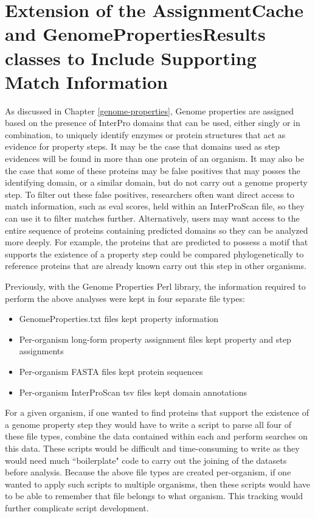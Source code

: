 \section{Extension of the AssignmentCache and GenomePropertiesResults classes to Include Supporting Match Information}

As discussed in Chapter \ref{genome-properties}, Genome properties are assigned based on the presence of InterPro domains that can be used, either singly or in combination, to uniquely identify enzymes or protein structures that act as evidence for property steps. It may be the case that domains used as step evidences will be found in more than one protein of an organism. It may also be the case that some of these proteins may be false positives that may posses the identifying domain, or a similar domain, but do not carry out a genome property step. To filter out these false positives, researchers often want direct access to match information, such as \gls{eval} scores, held within an InterProScan file, so they can use it to filter matches further. Alternatively, users may want access to the entire sequence of proteins containing predicted domains so they can be analyzed more deeply. For example, the proteins that are predicted to possess a motif that supports the existence of a property step could be compared phylogenetically to reference proteins that are already known carry out this step in other organisms. 

Previously, with the Genome Properties Perl library, the information required to perform the above analyses were kept in four separate file types:

\begin{itemize}
\item GenomeProperties.txt files kept property information
\item Per-organism long-form property assignment files kept property and step assignments
\item Per-organism FASTA files \cite{pearson19905} kept protein sequences 
\item  Per-organism InterProScan \gls{tsv} files kept domain annotations 
\end{itemize}

For a given organism, if one wanted to find proteins that support the existence of a genome property step they would have to write a script to parse all four of these file types, combine the data contained within each and perform searches on this data. These scripts would be difficult and time-consuming to write as they would need much ``boilerplate" code to carry out the joining of the datasets before analysis. Because the above file types are created per-organism, if one wanted to apply such scripts to multiple organisms, then these scripts would have to be able to remember that file belongs to what organism. This tracking would further complicate script development.

